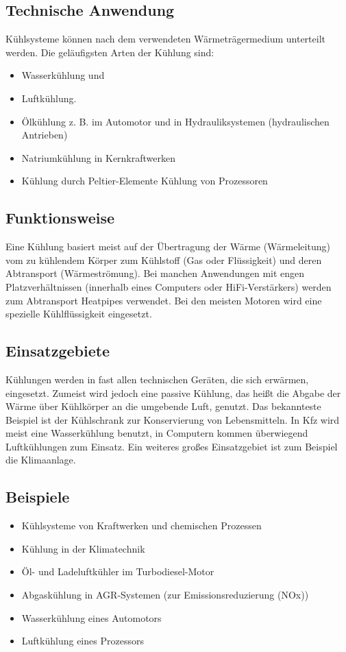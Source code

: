 \subsection{Technische Anwendung}

Kühlsysteme können nach dem verwendeten Wärmeträgermedium unterteilt werden. Die geläufigsten Arten der Kühlung sind:

\begin{itemize}
	\item Wasserkühlung und
	\item Luftkühlung.
	\item Ölkühlung z.  B. im Automotor und in Hydrauliksystemen (hydraulischen Antrieben) 
	\item Natriumkühlung in Kernkraftwerken
	\item Kühlung durch Peltier-Elemente Kühlung von Prozessoren
\end{itemize}

\subsection{Funktionsweise}

Eine Kühlung basiert meist auf der Übertragung der Wärme (Wärmeleitung) vom zu kühlendem Körper zum Kühlstoff (Gas oder Flüssigkeit) und deren Abtransport (Wärmeströmung).
Bei manchen Anwendungen mit engen Platzverhältnissen (innerhalb eines Computers oder HiFi-Verstärkers) werden zum Abtransport Heatpipes verwendet.
Bei den meisten Motoren wird eine spezielle Kühlflüssigkeit eingesetzt.

\subsection{Einsatzgebiete}

Kühlungen werden in fast allen technischen Geräten, die sich erwärmen, eingesetzt. Zumeist wird jedoch eine passive Kühlung, das heißt die Abgabe der Wärme über Kühlkörper an die umgebende Luft, genutzt.
Das bekannteste Beispiel ist der Kühlschrank zur Konservierung von Lebensmitteln. In Kfz wird meist eine Wasserkühlung benutzt, in Computern kommen überwiegend Luftkühlungen zum Einsatz. Ein weiteres großes Einsatzgebiet ist zum Beispiel die Klimaanlage.

\subsection{Beispiele}

\begin{itemize}
	\item Kühlsysteme von Kraftwerken und chemischen Prozessen
	\item Kühlung in der Klimatechnik
	\item Öl- und Ladeluftkühler im Turbodiesel-Motor
	\item Abgaskühlung in AGR-Systemen (zur Emissionsreduzierung (NOx))
	\item Wasserkühlung eines Automotors
	\item Luftkühlung eines Prozessors
\end{itemize}

